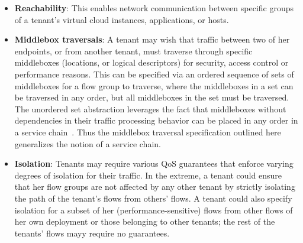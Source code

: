 \begin{itemize}
\item \textbf{Reachability}: This enables network communication
  between specific groups of a tenant's virtual cloud instances,
  applications, or hosts. 
\item \textbf{Middlebox traversals}: A tenant may wish that traffic
  between two of her endpoints, or from another tenant, must traverse
  through specific middleboxes (locations, or logical descriptors) for
  security, access control or performance reasons. This can be
  specified via an ordered sequence of sets of middleboxes for a flow
  group to traverse, where the middleboxes in a set can be traversed
  in any order, but all middleboxes in the set must be traversed.  The
  unordered set abstraction leverages the fact that middleboxes
  without dependencies in their traffic processing behavior can be
  placed in any order in a service chain~\cite{pga}. Thus the
  middlebox traversal specification outlined here generalizes the
  notion of a service chain.  


\item \textbf{Isolation}: Tenants may require various QoS guarantees
  that enforce varying degrees of isolation for their traffic. In the
  extreme, a tenant could ensure that her flow groups are not affected
  by any other tenant by strictly isolating the path of the tenant's
  flows from others' flows.  A tenant could also specify isolation for a subset of her
  (performance-sensitive) flows from other flows of her own deployment
  or those belonging to other tenants; the rest of the tenants' flows
  mayy require no guarantees.


\end{itemize}
